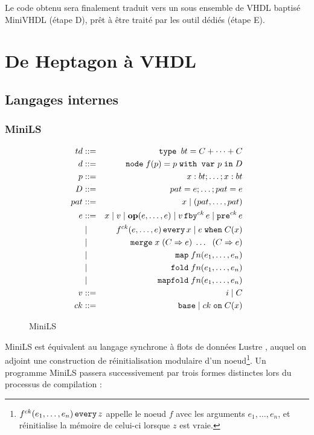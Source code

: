 \documentclass[a4paper]{article}
\newcommand{\LANG}{Heptagon}
\newcommand{\p}[0]{\; \vert \;}
\newcommand{\mybox}[1]{\mbox{\tt{#1}}}
\newcommand{\Coloneqq}[0]{::=}
\newcommand{\Node}[4]{\mybox{node} \; f(#1) = #2 \; \mybox{with var} \
  #3 \; \mybox{in} \; #4}
\newcommand{\Op}[2]{\mybox{\bf{op}}(#1,\dots,#2)}
\newcommand{\Fby}[2]{#1 \, \mybox{fby}^{ck} \, #2}
\newcommand{\Pre}[1]{\mybox{pre}^{ck} \, #1}
\newcommand{\Every}[4]{#1^{ck}(#2,\dots,#3) \, \mybox{every} \, #4}
\newcommand{\When}[3]{#1 \; \mybox{when} \; #2(#3)}
\newcommand{\Merge}[5]{\mybox{merge} \; #1 \; (#2 \Rightarrow #3) \; \dots \; \
  (#4 \Rightarrow #5)}
\newcommand{\Base}[0]{\mybox{base}}
\newcommand{\On}[3]{#1 \; \mybox{on} \; #2 (#3)}
\newcommand{\Map}[3]{\mathtt{map} \; #1 n (#2,\dots,#3)}
\newcommand{\Fold}[3]{\mathtt{fold} \; #1 n (#2,\dots,#3)}
\newcommand{\Mapfold}[3]{\mathtt{mapfold} \; #1 n (#2,\dots,#3)}
\begin{document}
Le code obtenu sera finalement traduit vers un sous ensemble de VHDL baptis\'e
MiniVHDL (étape D), prêt à \^etre trait\'e par les outil d\'edi\'es (étape E).

\section{De \LANG{} \`a VHDL}

\subsection{Langages internes}

\subsubsection{MiniLS}
\label{sec:syn:mls}

\begin{figure}[h]
  \centering
  \begin{eqnarray*}
    td & \Coloneqq & \mybox{type } bt = C + \dots + C \\
    d & \Coloneqq & \Node{p}{p}{p}{D} \\
    p & \Coloneqq & x : bt; \dots; x : bt \\
    D & \Coloneqq & pat = e; \dots; pat = e \\
    pat & \Coloneqq & x \p (pat,\dots,pat) \\
    e & \Coloneqq & x \p v \p \Op{e}{e} \p \Fby{v}{e} \p \Pre{e} \\
    & \p & \Every{f}{e}{e}{x} \p \When{e}{C}{x} \\
    & \p & \Merge{x}{C}{e}{C}{e} \\
    & \p & \Map{f}{e_1}{e_n} \\
    & \p & \Fold{f}{e_1}{e_n} \\
    & \p & \Mapfold{f}{e_1}{e_n} \\
    v & \Coloneqq & i \p C \\
    ck & \Coloneqq & \Base \p \On{ck}{C}{x}
  \end{eqnarray*}
  \caption{MiniLS}
  \label{fig:mls}
\end{figure}

MiniLS est \'equivalent au langage synchrone \`a flots de donn\'ees Lustre
\cite{lustre}, auquel on adjoint une construction de r\'einitialisation
modulaire d'un noeud\footnote{$\Every{f}{e_1}{e_n}{z}$ appelle le noeud $f$ avec
  les arguments $e_1,\dots,e_n$, et r\'einitialise la m\'emoire de celui-ci
  lorsque $z$ est vraie.}. Un programme MiniLS passera successivement par trois
formes distinctes lors du processus de compilation :
\end{document}
